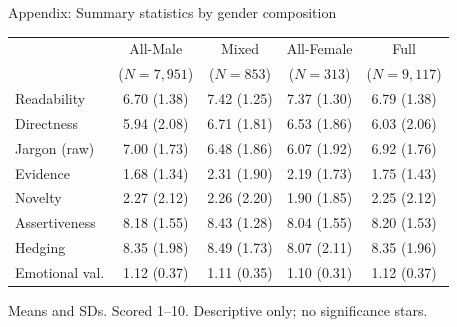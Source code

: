\documentclass[aspectratio=169,11pt]{beamer}
\begin{document}
\begin{frame}{Appendix: Summary statistics by gender composition}
    \RaggedRight
    \begin{center}
    {\small
    \begin{tabular}{lcccc}
        \toprule
        & All-Male & Mixed & All-Female & Full\\
        & ($N=7{,}951$) & ($N=853$) & ($N=313$) & ($N=9{,}117$)\\
        \midrule
        Readability    & 6.70 (1.38) & 7.42 (1.25) & 7.37 (1.30) & 6.79 (1.38)\\
        Directness     & 5.94 (2.08) & 6.71 (1.81) & 6.53 (1.86) & 6.03 (2.06)\\
        Jargon (raw)   & 7.00 (1.73) & 6.48 (1.86) & 6.07 (1.92) & 6.92 (1.76)\\
        Evidence       & 1.68 (1.34) & 2.31 (1.90) & 2.19 (1.73) & 1.75 (1.43)\\
        Novelty        & 2.27 (2.12) & 2.26 (2.20) & 1.90 (1.85) & 2.25 (2.12)\\
        Assertiveness  & 8.18 (1.55) & 8.43 (1.28) & 8.04 (1.55) & 8.20 (1.53)\\
        Hedging        & 8.35 (1.98) & 8.49 (1.73) & 8.07 (2.11) & 8.35 (1.96)\\
        Emotional val. & 1.12 (0.37) & 1.11 (0.35) & 1.10 (0.31) & 1.12 (0.37)\\
        \bottomrule
    \end{tabular}
    }
    \end{center}
    {\small\color{WarmGray} Means and SDs. Scored 1--10. Descriptive only; no significance stars.}
\end{frame}
\end{document}
